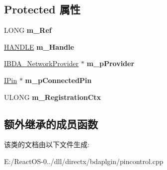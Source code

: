 \subsection*{Protected 属性}
\begin{DoxyCompactItemize}
\item 
\mbox{\label{class_c_b_d_a_pin_control_a2509ed38c49eb27d436fd8e9105ff64d}} 
L\+O\+NG {\bfseries m\+\_\+\+Ref}
\item 
\mbox{\label{class_c_b_d_a_pin_control_a79815992e8cb040f87017de0cde80100}} 
\hyperlink{interfacevoid}{H\+A\+N\+D\+LE} {\bfseries m\+\_\+\+Handle}
\item 
\mbox{\label{class_c_b_d_a_pin_control_ae38f0ec9ea6932a9da7857c7199743b0}} 
\hyperlink{interface_i_b_d_a___network_provider}{I\+B\+D\+A\+\_\+\+Network\+Provider} $\ast$ {\bfseries m\+\_\+p\+Provider}
\item 
\mbox{\label{class_c_b_d_a_pin_control_ac1b484ddf9372cb3145831345ec863e9}} 
\hyperlink{interface_i_pin}{I\+Pin} $\ast$ {\bfseries m\+\_\+p\+Connected\+Pin}
\item 
\mbox{\label{class_c_b_d_a_pin_control_acd454fbd00201e64443c6ad919de1bd5}} 
U\+L\+O\+NG {\bfseries m\+\_\+\+Registration\+Ctx}
\end{DoxyCompactItemize}
\subsection*{额外继承的成员函数}


该类的文档由以下文件生成\+:\begin{DoxyCompactItemize}
\item 
E\+:/\+React\+O\+S-\/0../dll/directx/bdaplgin/pincontrol.\+cpp\end{DoxyCompactItemize}
